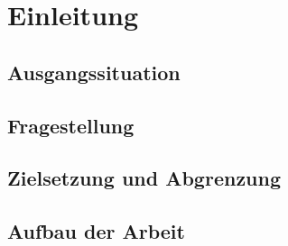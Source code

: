 \section{Einleitung}

\subsection{Ausgangssituation}


\subsection{Fragestellung}


\subsection{Zielsetzung und Abgrenzung}


\subsection{Aufbau der Arbeit}

